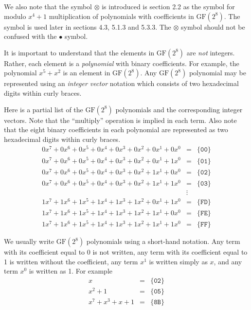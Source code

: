 \documentclass{article}
\newcommand{\GF}{\mathrm{GF}(2^8)}
\newcommand{\gfmul}{\bullet}
\begin{document}
We also note that the symbol $\otimes$ is introduced is section 2.2
as the symbol for modulo $x^4 + 1$ multiplication of polynomials with coefficients in $\GF$.
The symbol is used later in sections 4.3, 5.1.3 and 5.3.3.
The $\otimes$ symbol should not be confused with the $\gfmul$ symbol.

It is important to understand that the elements in $\GF$ are \emph{not} integers.
Rather, each element is a \emph{polynomial} with binary coefficients.
For example, the polynomial $x^5 + x^2$ is an element in $\GF$.
Any $\GF$ polynomial may be represented using an \emph{integer vector} notation
which consists of two hexadecimal digits within curly braces.

Here is a partial list of the $\GF$ polynomials and the corresponding integer vectors.
Note that the ``multiply'' operation is implied in each term.
Also note that the eight binary coefficients in each polynomial
are represented as two hexadecimal digits within curly braces.
\begin{eqnarray*}
  0 x^7 + 0 x^6 + 0 x^5 + 0 x^4 + 0 x^3 + 0 x^2 + 0 x^1 + 0 x^0  &=&  \{\mathtt{00}\} \\
  0 x^7 + 0 x^6 + 0 x^5 + 0 x^4 + 0 x^3 + 0 x^2 + 0 x^1 + 1 x^0  &=&  \{\mathtt{01}\} \\
  0 x^7 + 0 x^6 + 0 x^5 + 0 x^4 + 0 x^3 + 0 x^2 + 1 x^1 + 0 x^0  &=&  \{\mathtt{02}\} \\
  0 x^7 + 0 x^6 + 0 x^5 + 0 x^4 + 0 x^3 + 0 x^2 + 1 x^1 + 1 x^0  &=&  \{\mathtt{03}\} \\
  &\vdots& \\
  1 x^7 + 1 x^6 + 1 x^5 + 1 x^4 + 1 x^3 + 1 x^2 + 0 x^1 + 1 x^0  &=&  \{\mathtt{FD}\} \\
  1 x^7 + 1 x^6 + 1 x^5 + 1 x^4 + 1 x^3 + 1 x^2 + 1 x^1 + 0 x^0  &=&  \{\mathtt{FE}\} \\
  1 x^7 + 1 x^6 + 1 x^5 + 1 x^4 + 1 x^3 + 1 x^2 + 1 x^1 + 1 x^0  &=&  \{\mathtt{FF}\}
\end{eqnarray*}

We usually write $\GF$ polynomials using a short-hand notation.
Any term with its coefficient equal to 0 is not written,
any term with its coefficient equal to 1 is written without the coefficient,
any term $x^1$ is written simply as $x$, and any term $x^0$ is written as 1.
For example
\begin{eqnarray*}
  x  &=&  \{\mathtt{02}\} \\
  x^2 + 1  &=&  \{\mathtt{05}\} \\
  x^7 + x^3 + x + 1  &=&  \{\mathtt{8B}\}
\end{eqnarray*}
\end{document}
